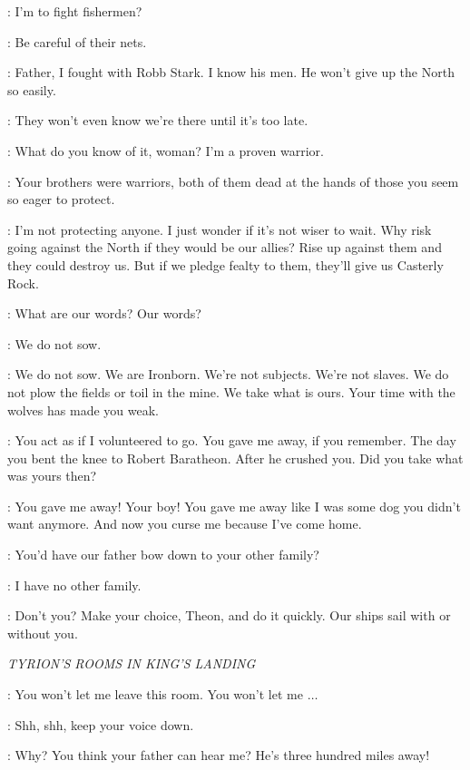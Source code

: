 \THEON: I'm to fight fishermen? 

\YARA: Be careful of their nets. 

\THEON: Father, I fought with Robb Stark. I know his men. He won't give up the North so easily. 

\YARA: They won't even know we're there until it's too late. 

\THEON: What do you know of it, woman? I'm a proven warrior. 

\BALON: Your brothers were warriors, both of them dead at the hands of those you seem so eager to protect. 

\THEON: I'm not protecting anyone. I just wonder if it's not wiser to wait. Why risk going against the North if they would be our allies? Rise up against them and they could destroy us. But if we pledge fealty to them, they'll give us Casterly Rock. 

\BALON: What are our words? Our words? 

\THEON: We do not sow. 

\BALON: We do not sow. We are Ironborn. We're not subjects. We're not slaves. We do not plow the fields or toil in the mine. We take what is ours. Your time with the wolves has made you weak. 

\THEON: You act as if I volunteered to go. You gave me away, if you remember. The day you bent the knee to Robert Baratheon. After he crushed you. Did you take what was yours then? 


\THEON: You gave me away! Your boy! You gave me away like I was some dog you didn't want anymore. And now you curse me because I've come home. 

\YARA: You'd have our father bow down to your other family? 

\THEON: I have no other family. 

\BALON: Don't you? Make your choice, Theon, and do it quickly. Our ships sail with or without you. 


\scene

\textit{TYRION'S ROOMS IN KING'S LANDING}


\SHAE: You won't let me leave this room. You won't let me $\ldots$  

\TYRION: Shh, shh, keep your voice down. 

\SHAE: Why? You think your father can hear me? He's three hundred miles away! 

